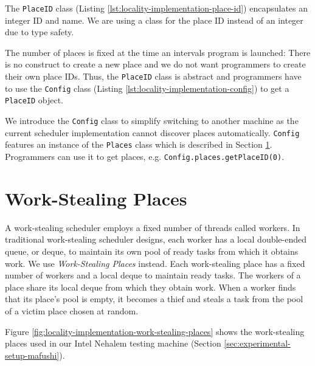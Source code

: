 The \lstinline!PlaceID! class (Listing
\ref{lst:locality-implementation-place-id}) encapsulates an integer ID
and name. We are using a class for the place ID instead of an integer
due to type safety. 

The number of places is fixed at the time an intervals program is
launched: There is no construct to create a new place and we do not
want programmers to create their own place IDs. Thus, the
\lstinline!PlaceID!  class is abstract and programmers have to use the
\lstinline!Config! class (Listing
\ref{lst:locality-implementation-config}) to get a \lstinline!PlaceID!
object.



We introduce the \lstinline!Config! class to simplify switching to
another machine as the current scheduler implementation cannot
discover places automatically. \lstinline!Config! features an instance
of the \lstinline!Places! class which is described in Section
\ref{sec:locality-implementation-work-stealing-places}. Programmers
can use it to get places,
e.g. \lstinline!Config.places.getPlaceID(0)!.




\section{Work-Stealing Places}
\label{sec:locality-implementation-work-stealing-places}

A work-stealing scheduler employs a fixed number of threads called
workers. In traditional work-stealing scheduler designs, each worker
has a local double-ended queue, or deque, to maintain its own pool of
ready tasks from which it obtains work. We use \emph{Work-Stealing
  Places} instead. Each work-stealing place has a fixed number of
workers and a local deque to maintain ready tasks. The workers of a
place share its local deque from which they obtain work. When a worker
finds that its place's pool is empty, it becomes a thief and steals a
task from the pool of a victim place chosen at random.

Figure \ref{fig:locality-implementation-work-stealing-places} shows
the work-stealing places used in our Intel Nehalem testing machine
(Section \ref{sec:experimental-setup-mafushi}).

